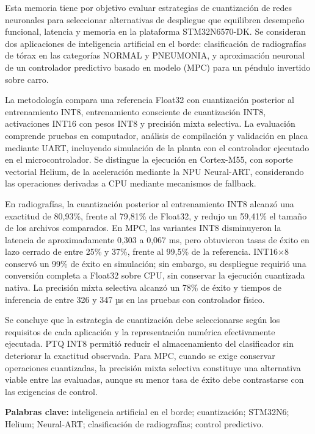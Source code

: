 Esta memoria tiene por objetivo evaluar estrategias de cuantización de redes neuronales para seleccionar alternativas de despliegue que equilibren desempeño funcional, latencia y memoria en la plataforma STM32N6570-DK. Se consideran dos aplicaciones de inteligencia artificial en el borde: clasificación de radiografías de tórax en las categorías NORMAL y PNEUMONIA, y aproximación neuronal de un controlador predictivo basado en modelo (MPC) para un péndulo invertido sobre carro.

La metodología compara una referencia Float32 con cuantización posterior al entrenamiento INT8, entrenamiento consciente de cuantización INT8, activaciones INT16 con pesos INT8 y precisión mixta selectiva. La evaluación comprende pruebas en computador, análisis de compilación y validación en placa mediante UART, incluyendo simulación de la planta con el controlador ejecutado en el microcontrolador. Se distingue la ejecución en Cortex-M55, con soporte vectorial Helium, de la aceleración mediante la NPU Neural-ART, considerando las operaciones derivadas a CPU mediante mecanismos de fallback.

En radiografías, la cuantización posterior al entrenamiento INT8 alcanzó una exactitud de 80,93\%, frente al 79,81\% de Float32, y redujo un 59,41\% el tamaño de los archivos comparados. En MPC, las variantes INT8 disminuyeron la latencia de aproximadamente 0,303 a 0,067 ms, pero obtuvieron tasas de éxito en lazo cerrado de entre 25\% y 37\%, frente al 99,5\% de la referencia. INT16×8 conservó un 99\% de éxito en simulación; sin embargo, su despliegue requirió una conversión completa a Float32 sobre CPU, sin conservar la ejecución cuantizada nativa. La precisión mixta selectiva alcanzó un 78\% de éxito y tiempos de inferencia de entre 326 y 347 µs en las pruebas con controlador físico.

Se concluye que la estrategia de cuantización debe seleccionarse según los requisitos de cada aplicación y la representación numérica efectivamente ejecutada. PTQ INT8 permitió reducir el almacenamiento del clasificador sin deteriorar la exactitud observada. Para MPC, cuando se exige conservar operaciones cuantizadas, la precisión mixta selectiva constituye una alternativa viable entre las evaluadas, aunque su menor tasa de éxito debe contrastarse con las exigencias de control.


\textbf{Palabras clave:} inteligencia artificial en el borde; cuantización; STM32N6; Helium; Neural-ART; clasificación de radiografías; control predictivo.
